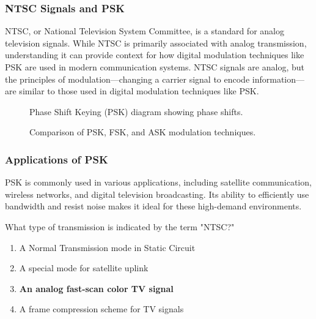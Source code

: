 \subsubsection*{NTSC Signals and PSK}
NTSC, or National Television System Committee, is a standard for analog television signals. While NTSC is primarily associated with analog transmission, understanding it can provide context for how digital modulation techniques like PSK are used in modern communication systems. NTSC signals are analog, but the principles of modulation—changing a carrier signal to encode information—are similar to those used in digital modulation techniques like PSK.

\begin{figure}[h]
\centering
\caption{Phase Shift Keying (PSK) diagram showing phase shifts.}
\label{fig:psk-diagram}
\end{figure}

\begin{figure}[h]
\centering
\caption{Comparison of PSK, FSK, and ASK modulation techniques.}
\label{fig:modulation-comparison}
\end{figure}

\subsubsection*{Applications of PSK}
PSK is commonly used in various applications, including satellite communication, wireless networks, and digital television broadcasting. Its ability to efficiently use bandwidth and resist noise makes it ideal for these high-demand environments.

\begin{tcolorbox}[colback=gray!10!white,colframe=black!75!black,title={T8D04}]
What type of transmission is indicated by the term "NTSC?"
\begin{enumerate}[label=\Alph*),noitemsep]
    \item A Normal Transmission mode in Static Circuit
    \item A special mode for satellite uplink
    \item \textbf{An analog fast-scan color TV signal}
    \item A frame compression scheme for TV signals
\end{enumerate}
\end{tcolorbox}

